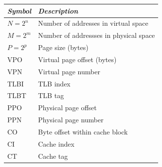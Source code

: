     \begin{table}[ht]
        \centering
        \begin{tabular}{|l|l|}
            \hline
            \textit{Symbol} & \textit{Description}\\
            \hline
            \hline
            $N=2^n$ & Number of addresses in virtual space\\
            $M=2^m$ & Number of addressses in physical space\\
            $P=2^p$ & Page size (bytes)\\
            \hline
            VPO & Virtual page offset (bytes)\\
            VPN & Virtual page number\\
            TLBI & TLB index\\
            TLBT & TLB tag\\
            \hline
            PPO & Physical page offset\\
            PPN & Physical page number\\
            CO & Byte offset within cache block\\
            CI & Cache index\\
            CT & Cache tag\\
            \hline
        \end{tabular}
    \end{table}
